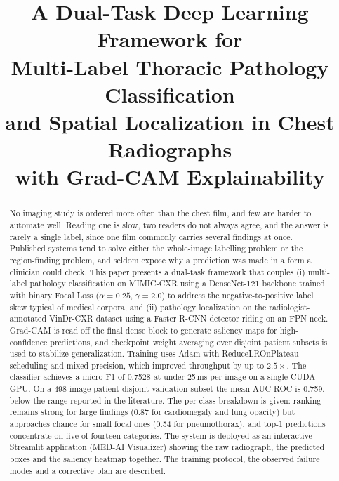 \documentclass[conference]{IEEEtran}
\begin{document}
\title{A Dual-Task Deep Learning Framework for\\
Multi-Label Thoracic Pathology Classification\\
and Spatial Localization in Chest Radiographs\\
with Grad-CAM Explainability}

\author{}

\maketitle

\begin{abstract}
\normalfont
No imaging study is ordered more often than the chest film, and few are harder
to automate well. Reading one is slow, two readers do not always agree, and the
answer is rarely a single label, since one film commonly carries several
findings at once. Published systems tend to solve either the whole-image
labelling problem or the region-finding problem, and seldom expose why a
prediction was made in a form a clinician could check. This paper presents a dual-task framework that couples (i) multi-label
pathology classification on MIMIC-CXR using a DenseNet-121 backbone trained
with binary Focal Loss ($\alpha{=}0.25$, $\gamma{=}2.0$) to address the
negative-to-positive label skew typical of medical corpora, and (ii) pathology
localization on the radiologist-annotated VinDr-CXR dataset using a Faster
R-CNN detector riding on an FPN neck. Grad-CAM is read off the
final dense block to generate saliency maps for high-confidence predictions,
and checkpoint weight averaging over disjoint patient subsets is used to
stabilize generalization. Training uses Adam with ReduceLROnPlateau scheduling
and mixed precision, which improved throughput by up to $2.5\times$. The
classifier achieves a micro F1 of 0.7528 at under 25\,ms per image on a single
CUDA GPU. On a 498-image patient-disjoint validation subset the mean AUC-ROC is
0.759, below the range reported in the literature. The per-class breakdown is
given: ranking remains strong for
large findings (0.87 for cardiomegaly and lung opacity) but approaches chance
for small focal ones (0.54 for pneumothorax), and top-1 predictions concentrate
on five of fourteen categories. The system is deployed as an interactive
Streamlit application (MED-AI Visualizer) showing the raw radiograph, the
predicted boxes and the saliency heatmap together. The training protocol, the
observed failure modes and a corrective plan are described.
\end{abstract}
\end{document}
